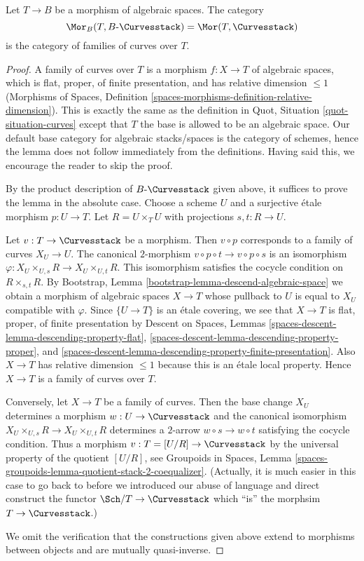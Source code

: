\begin{lemma}
\label{lemma-extend-curves-to-spaces}
Let $T \to B$ be a morphism of algebraic spaces. The category
$$
\Mor_B(T, B\text{-}\Curvesstack) = \Mor(T, \Curvesstack)
$$
is the category of families of curves over $T$.
\end{lemma}

\begin{proof}
A family of curves over $T$ is a morphism $f : X \to T$ of algebraic
spaces, which is flat, proper, of finite presentation, and has
relative dimension $\leq 1$ (Morphisms of Spaces, Definition
\ref{spaces-morphisms-definition-relative-dimension}).
This is exactly the same as the definition in
Quot, Situation \ref{quot-situation-curves}
except that $T$ the base is allowed to be an algebraic space.
Our default base category for algebraic stacks/spaces
is the category of schemes, hence the lemma does not follow
immediately from the definitions. Having said this, we encourage
the reader to skip the proof.

\medskip\noindent
By the product description of $B\text{-}\Curvesstack$ given above,
it suffices to prove the lemma in the absolute case. Choose a scheme
$U$ and a surjective \'etale morphism $p : U \to T$.
Let $R = U \times_T U$ with projections $s, t : R \to U$.

\medskip\noindent
Let $v : T \to \Curvesstack$ be a morphism. Then $v \circ p$
corresponds to a family of curves $X_U \to U$. The canonical
$2$-morphism $v \circ p \circ t \to v \circ p \circ s$
is an isomorphism $\varphi : X_U \times_{U, s} R \to X_U \times_{U, t} R$.
This isomorphism satisfies the cocycle condition on
$R \times_{s, t} R$.
By Bootstrap, Lemma \ref{bootstrap-lemma-descend-algebraic-space}
we obtain a morphism of algebraic spaces $X \to T$
whose pullback to $U$ is equal to $X_U$ compatible with $\varphi$.
Since $\{U \to T\}$ is an \'etale covering, we see that
$X \to T$ is flat, proper, of finite presentation by
Descent on Spaces, Lemmas
\ref{spaces-descent-lemma-descending-property-flat},
\ref{spaces-descent-lemma-descending-property-proper}, and
\ref{spaces-descent-lemma-descending-property-finite-presentation}.
Also $X \to T$ has relative dimension $\leq 1$ because this is
an \'etale local property. Hence $X \to T$ is a family of curves over $T$.

\medskip\noindent
Conversely, let $X \to T$ be a family of curves. Then the
base change $X_U$ determines a morphism $w : U \to \Curvesstack$
and the canonical isomorphism $X_U \times_{U, s} R \to X_U \times_{U, t} R$
determines a $2$-arrow $w \circ s \to w \circ t$ satisfying the
cocycle condition. Thus a morphism $v : T = [U/R] \to \Curvesstack$
by the universal property of the quotient $[U/R]$, see
Groupoids in Spaces, Lemma
\ref{spaces-groupoids-lemma-quotient-stack-2-coequalizer}.
(Actually, it is much easier in this case to go back to before
we introduced our abuse of language and direct construct
the functor $\Sch/T \to \Curvesstack$ which ``is'' the
morphsim $T \to \Curvesstack$.)

\medskip\noindent
We omit the verification that the constructions given above
extend to morphisms between objects and are mutually quasi-inverse.
\end{proof}
